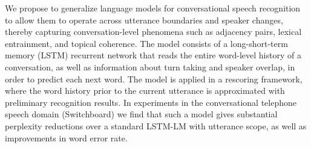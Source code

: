 We propose to generalize language models for conversational speech recognition to allow them to operate across utterance boundaries and speaker changes, thereby capturing conversation-level phenomena such as adjacency pairs, lexical entrainment, and topical coherence. The model consists of a long-short-term memory (LSTM) recurrent network that reads the entire word-level history of a conversation, as well as information about turn taking and speaker overlap, in order to predict each next word. The model is applied in a rescoring framework, where the word history prior to the current utterance is approximated with preliminary recognition results. In experiments in the conversational telephone speech domain (Switchboard) we find that such a model gives substantial perplexity reductions over a standard LSTM-LM with utterance scope, as well as improvements in word error rate.
